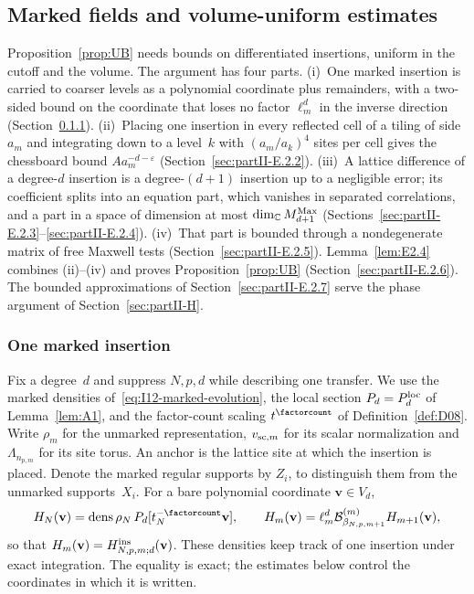 \subsection{Marked fields and volume-uniform estimates}\label{sec:partII-E.2}

Proposition~\ref{prop:UB} needs bounds on differentiated insertions, uniform in the cutoff and the volume. The argument has four parts. (i)~One marked insertion is carried to coarser levels as a polynomial coordinate plus remainders, with a two-sided bound on the coordinate that loses no factor $\ell_m^d$ in the inverse direction (Section~\ref{sec:partII-E.2.1}). (ii)~Placing one insertion in every reflected cell of a tiling of side $a_m$ and integrating down to a level~$k$ with $(a_m/a_k)^4$ sites per cell gives the chessboard bound $Aa_m^{-d-\varepsilon}$ (Section~\ref{sec:partII-E.2.2}). (iii)~A lattice difference of a degree-$d$ insertion is a degree-$(d+1)$ insertion up to a negligible error; its coefficient splits into an equation part, which vanishes in separated correlations, and a part in a space of dimension at most $\dim_{\mathbb{C}}M_{d+1}^{\mathrm{Max}}$ (Sections~\ref{sec:partII-E.2.3}--\ref{sec:partII-E.2.4}). (iv)~That part is bounded through a nondegenerate matrix of free Maxwell tests (Section~\ref{sec:partII-E.2.5}). Lemma~\ref{lem:E2.4} combines (ii)--(iv) and proves Proposition~\ref{prop:UB} (Section~\ref{sec:partII-E.2.6}). The bounded approximations of Section~\ref{sec:partII-E.2.7} serve the phase argument of Section~\ref{sec:partII-H}.

\subsubsection{One marked insertion}\label{sec:partII-E.2.1}

Fix a degree~$d$ and suppress $N,p,d$ while describing one transfer. We use the marked densities of~\eqref{eq:I12-marked-evolution}, the local section $P_d=P_{d}^{\mathrm{loc}}$ of Lemma~\ref{lem:A1}, and the factor-count scaling $t^{\factorcount}$ of Definition~\ref{def:D08}. Write $\rho_m$ for the unmarked representation, $v_{{\rm sc},m}$ for its scalar normalization and $\Lambda_{n_{p,m}}$ for its site torus. An anchor is the lattice site at which the insertion is placed. Denote the marked regular supports by $Z_i$, to distinguish them from the unmarked supports~$X_i$. For a bare polynomial coordinate $\mathbf v\in V_d$,
\begin{equation}\label{eq:E-marked-evolution}
 H_N(\mathbf v)=\density\rho_N\,P_d[t_N^{-\factorcount}\mathbf v],\qquad
 H_m(\mathbf v)=\ell_m^d\blockmap{m}_{\beta_{N,p,m+1}}H_{m+1}(\mathbf v),
\end{equation}
so that $H_m(\mathbf v)=H^{\rm ins}_{N,p,m;d}(\mathbf v)$. These densities keep track of one insertion under exact integration. The equality is exact; the estimates below control the coordinates in which it is written.

